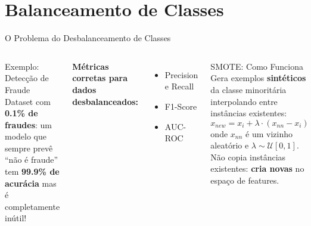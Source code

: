 \documentclass[aspectratio=169]{beamer}
\begin{document}
\section{Balanceamento de Classes}

\begin{frame}{O Problema do Desbalanceamento de Classes}
    \begin{columns}[T]
        \begin{alertblock}{Exemplo: Detecção de Fraude}
            \small Dataset com \textbf{0.1\% de fraudes}: um modelo que sempre prevê ``não é fraude'' tem \textbf{99.9\% de acurácia} mas é completamente inútil!
        \end{alertblock}

        \vspace{0.5em}
        \textbf{Métricas corretas para dados desbalanceados:}
        \begin{itemize}
            \item Precision e Recall
            \item F1-Score
            \item AUC-ROC
        \end{itemize}

        \begin{block}{SMOTE: Como Funciona}
            \small Gera exemplos \textbf{sintéticos} da classe minoritária interpolando entre instâncias existentes:
            \[x_{new} = x_i + \lambda \cdot (x_{nn} - x_i)\]
            \footnotesize onde $x_{nn}$ é um vizinho aleatório e $\lambda \sim \mathcal{U}[0,1]$.\\[0.3em]
            Não copia instâncias existentes: \textbf{cria novas} no espaço de features.
        \end{block}
    \end{columns}
\end{frame}
\end{document}
